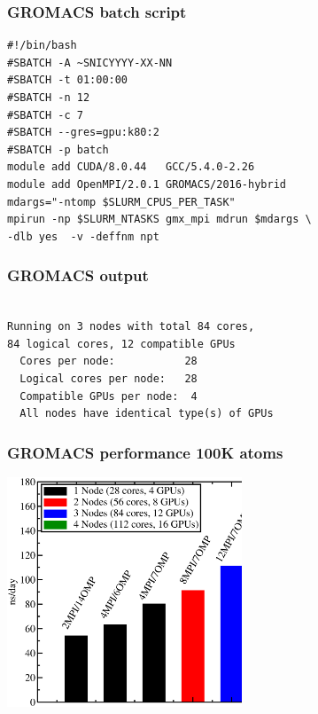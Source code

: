 \begin{frame}[fragile]
	\frametitle{GROMACS batch script}
        \begin{verbatim}             
#!/bin/bash
#SBATCH -A ~SNICYYYY-XX-NN
#SBATCH -t 01:00:00
#SBATCH -n 12
#SBATCH -c 7
#SBATCH --gres=gpu:k80:2
#SBATCH -p batch
module add CUDA/8.0.44   GCC/5.4.0-2.26   
module add OpenMPI/2.0.1 GROMACS/2016-hybrid
mdargs="-ntomp $SLURM_CPUS_PER_TASK"
mpirun -np $SLURM_NTASKS gmx_mpi mdrun $mdargs \ 
-dlb yes  -v -deffnm npt
        \end{verbatim}
\end{frame}



\begin{frame}[fragile]
	\frametitle{GROMACS output}
  
        \begin{verbatim}             
    
Running on 3 nodes with total 84 cores, 
84 logical cores, 12 compatible GPUs
  Cores per node:           28                                          
  Logical cores per node:   28                 
  Compatible GPUs per node:  4                 
  All nodes have identical type(s) of GPUs  

        \end{verbatim}

\end{frame}

\begin{frame}
	\frametitle{GROMACS performance 100K atoms}
        \begin{center}
		\includegraphics[width=7cm]{images/data_kebne.eps}
        \end{center}
\end{frame}

